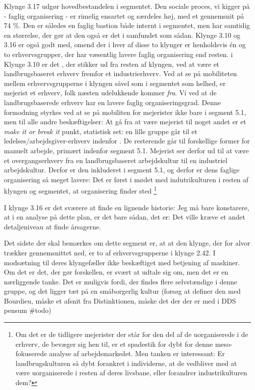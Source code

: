 Klynge 3.17 udgør hovedbestandelen i segmentet. Den sociale proces, vi kigger på - faglig organisering - er rimelig ensartet og særdeles høj, med et gennemsnit på 74 \%. Den er således en faglig bastion både internt i segmentet, men har samtidig en størrelse, der gør at den også er det i samfundet som sådan. Klynge 3.10 og 3.16 er også godt med, omend der i hver af disse to klynger er henholdsvis én og to erhvervsgrupper, der har væsentlig lavere faglig organisering end resten. i Klynge 3.10 er det , der stikker ud fra resten af klyngen, ved at være et landbrugsbaseret erhverv fremfor et industrierhverv. Ved at se på mobiliteten mellem erhvervsgrupperne i klyngen såvel som i segmentet som helhed, er mejerist et erhverv, folk næsten udelukkende kommer \emph{fra}. Vi ved at de landbrugsbaserede erhverv har en lavere faglig organiseringsgrad. Denne formodning styrkes ved at se på mobiliten for mejerister ikke bare i segment 5.1, men til alle andre beskæftigelser: At gå fra at være mejerist til noget andet er et \emph{make it or break it} punkt, statistisk set: en lille gruppe går til et ledelses/arbejdsgiver-erhverv indenfor . De resterende går til forskellige former for manuelt arbejde, primært indenfor segment 5.1. Mejerist ser derfor ud til at være et overgangserhverv fra en landbrugsbaseret arbejdskultur til en industriel arbejdskultur. Derfor er den inkluderet i segment 5.1, og derfor er dens faglige organisering så meget lavere: Det er først i mødet med indutrikulturen i resten af klyngen og segmentet, at organisering finder sted%
%
\footnote{ Om det er de tidligere mejerister der står for den del af de uorganiserede i de erhverv, de bevæger sig hen til, er et spadestik for dybt for denne meso-fokuserede analyse af arbejdsmarkedet. Men tanken er interessant: Er landbrugskulturen så dybt forankret i individerne, at de vedbliver med at være uorganiserede i resten af deres livsbane, eller forandrer industrikulturen dem?}%
%

I klynge 3.16 er det sværere at finde en lignende historie: Jeg må bare konstarere, at i en analyse på dette plan, er det bare sådan, det er: Det ville kræve et andet detaljeniveau at finde årsagerne.

Det sidste der skal bemærkes om dette segment er, at at den klynge, der for alvor trækker gennemsnittet ned, er to af erhvervsgrupperne i klynge 2.42. I modsætning til deres klyngefæller ikke beskæftiget med betjening af maskiner. Om det er det, der gør forskellen, er svært at udtale sig om, men det er en nærliggende tanke. Det er muligvis fordi, der findes flere selvstændige i denne gruppe, og det ligger tæt på en småborgerlig kultur (forsøg at definer den med Bourdieu, måske et afsnit fra Distinktionen, måske det der der er med i DDS pensum \#todo)

